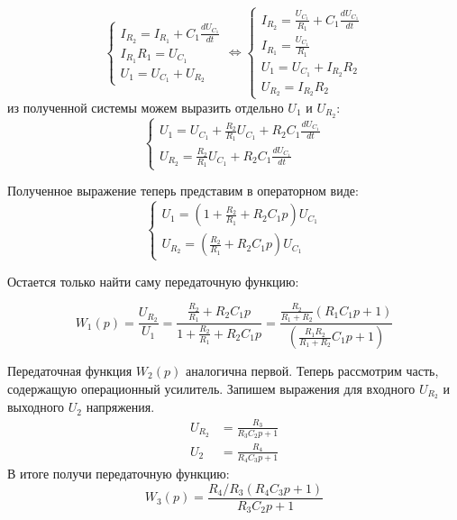 \documentclass[russian, utf8]{eskdtext}
\begin{document}
\begin{equation*}
    \begin{cases}
        I_{R_2} = I_{R_1} + C_1\frac{dU_{C_1}}{dt} \\
        I_{R_1}R_1 = U_{C_1} \\
        U_1 = U_{C_1} + U_{R_2}
    \end{cases}
    \Leftrightarrow
    \begin{cases}
        I_{R_2} = \frac{U_{C_1}}{R_1} + C_1\frac{dU_{C_1}}{dt} \\
        I_{R_1} = \frac{U_{C_1}}{R_1} \\
        U_1 = U_{C_1} + I_{R_2}R_2 \\
        U_{R_2} = I_{R_2}R_2
    \end{cases}
\end{equation*}
из полученной системы можем выразить отдельно $U_1$ и $U_{R_2}$:
\begin{equation*}
    \begin{cases}
        U_1 = U_{C_1} + \frac{R_2}{R_1}U_{C_1} + R_2C_1\frac{dU_{C_1}}{dt} \\
        U_{R_2} = \frac{R_2}{R_1}U_{C_1} + R_2C_1\frac{dU_{C_1}}{dt}
    \end{cases}
\end{equation*} \par
Полученное выражение теперь представим в операторном виде:
\begin{equation*}
    \begin{cases}
        U_1 = \left( 1 + \frac{R_2}{R_1} + R_2C_1p \right) U_{C_1} \\
        U_{R_2} = \left( \frac{R_2}{R_1} + R_2C_1p \right) U_{C_1}
    \end{cases}
\end{equation*} \par

Остается только найти саму передаточную функцию: \par
\begin{equation}
    W_1(p) = \frac{U_{R_2}}{U_1} = \frac{\frac{R_2}{R_1} + R_2C_1p}{1 + \frac{R_2}{R_1} + R_2C_1p} = \frac{\frac{R_2}{R_1 + R_2}\left( R_1C_1p + 1 \right)}{\left( \frac{R_1R_2}{R_1 + R_2}C_1p + 1 \right)}
\end{equation}

Передаточная функция $W_2(p)$ аналогична первой. Теперь рассмотрим часть, содержащую операционный усилитель. Запишем выражения для входного $U_{R_2}$ и выходного $U_2$ напряжения.
\begin{align*}
    U_{R_2} & = \frac{R_3}{R_3C_2 p + 1} \\
    U_2 & = \frac{R_4}{R_4C_3 p + 1}
\end{align*}
В итоге получи передаточную функцию:
\begin{equation*}
    W_3(p) = \frac{R_4/R_3(R_4 C_3 p + 1)}{R_3C_2 p + 1}
\end{equation*}
\end{document}
